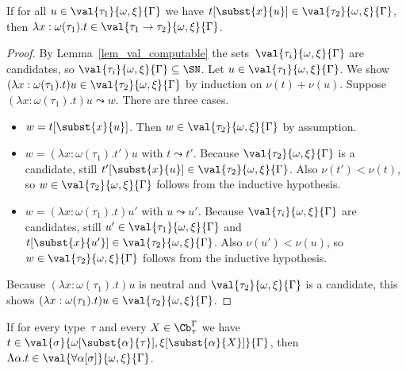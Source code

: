 
\begin{lemma}
 If for all $u \in \val{\tau_1}{\omega,\xi}{\Gamma}$ we have
 $t[\subst{x}{u}] \in \val{\tau_2}{\omega,\xi}{\Gamma}$, then
 $\lambda x : \omega(\tau_1) . t \in
 \val{\tau_1\to\tau_2}{\omega,\xi}{\Gamma}$.
\end{lemma}

\begin{proof}
 By Lemma~\ref{lem_val_computable} the
 sets~$\val{\tau_i}{\omega,\xi}{\Gamma}$ are candidates, so
 $\val{\tau_i}{\omega,\xi}{\Gamma} \subseteq \SN$. Let
 $u \in \val{\tau_1}{\omega,\xi}{\Gamma}$. We show
 $(\lambda x : \omega(\tau_1) . t) u \in
 \val{\tau_2}{\omega,\xi}{\Gamma}$ by induction on $\nu(t) +
 \nu(u)$. Suppose $(\lambda x : \omega(\tau_1) . t) u \leadsto
 w$. There are three cases.
 \begin{itemize}
 \item $w = t[\subst{x}{u}]$. Then
   $w \in \val{\tau_2}{\omega,\xi}{\Gamma}$ by assumption.
 \item $w = (\lambda x : \omega(\tau_1) . t') u$ with
   $t \leadsto t'$. Because $\val{\tau_2}{\omega,\xi}{\Gamma}$ is a
   candidate, still
   $t'[\subst{x}{u}] \in \val{\tau_2}{\omega,\xi}{\Gamma}$. Also
   $\nu(t') < \nu(t)$, so $w \in \val{\tau_2}{\omega,\xi}{\Gamma}$
   follows from the inductive hypothesis.
 \item $w = (\lambda x : \omega(\tau_1) . t) u'$ with
   $u \leadsto u'$. Because $\val{\tau_i}{\omega,\xi}{\Gamma}$ are
   candidates, still $u' \in \val{\tau_1}{\omega,\xi}{\Gamma}$ and
   $t[\subst{x}{u'}] \in \val{\tau_2}{\omega,\xi}{\Gamma}$. Also
   $\nu(u') < \nu(u)$, so $w \in \val{\tau_2}{\omega,\xi}{\Gamma}$
   follows from the inductive hypothesis.
 \end{itemize}
 Because $(\lambda x : \omega(\tau_1) . t) u$ is neutral and
 $\val{\tau_2}{\omega,\xi}{\Gamma}$ is a candidate, this shows
 $(\lambda x : \omega(\tau_1) . t) u \in
 \val{\tau_2}{\omega,\xi}{\Gamma}$.
\end{proof}

\begin{lemma}
 If for every type~$\tau$ and every $X \in \Cb_\tau^\Gamma$ we have
 $t \in
 \val{\sigma}{\omega[\subst{\alpha}{\tau}],\xi[\subst{\alpha}{X}]}{\Gamma}$,
 then
 $\Lambda \alpha . t \in
 \val{\forall\alpha[\sigma]}{\omega,\xi}{\Gamma}$.
\end{lemma}

